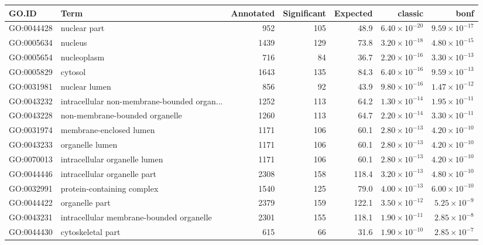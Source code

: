 \begin{table}[ht]
\centering
\begin{adjustbox}{max width=\textwidth}
\begin{tabular}{llrrrrr}
  \hline
GO.ID & Term & Annotated & Significant & Expected & classic & bonf \\ 
  \hline
GO:0044428 & nuclear part & 952 & 105 & 48.9 & $6.40 \times 10^{-20}$ & $9.59 \times 10^{-17}$ \\ 
  GO:0005634 & nucleus & 1439 & 129 & 73.8 & $3.20 \times 10^{-18}$ & $4.80 \times 10^{-15}$ \\ 
  GO:0005654 & nucleoplasm & 716 & 84 & 36.7 & $2.20 \times 10^{-16}$ & $3.30 \times 10^{-13}$ \\ 
  GO:0005829 & cytosol & 1643 & 135 & 84.3 & $6.40 \times 10^{-16}$ & $9.59 \times 10^{-13}$ \\ 
  GO:0031981 & nuclear lumen & 856 & 92 & 43.9 & $9.80 \times 10^{-16}$ & $1.47 \times 10^{-12}$ \\ 
  GO:0043232 & intracellular non-membrane-bounded organ... & 1252 & 113 & 64.2 & $1.30 \times 10^{-14}$ & $1.95 \times 10^{-11}$ \\ 
  GO:0043228 & non-membrane-bounded organelle & 1260 & 113 & 64.7 & $2.20 \times 10^{-14}$ & $3.30 \times 10^{-11}$ \\ 
  GO:0031974 & membrane-enclosed lumen & 1171 & 106 & 60.1 & $2.80 \times 10^{-13}$ & $4.20 \times 10^{-10}$ \\ 
  GO:0043233 & organelle lumen & 1171 & 106 & 60.1 & $2.80 \times 10^{-13}$ & $4.20 \times 10^{-10}$ \\ 
  GO:0070013 & intracellular organelle lumen & 1171 & 106 & 60.1 & $2.80 \times 10^{-13}$ & $4.20 \times 10^{-10}$ \\ 
  GO:0044446 & intracellular organelle part & 2308 & 158 & 118.4 & $3.20 \times 10^{-13}$ & $4.80 \times 10^{-10}$ \\ 
  GO:0032991 & protein-containing complex & 1540 & 125 & 79.0 & $4.00 \times 10^{-13}$ & $6.00 \times 10^{-10}$ \\ 
  GO:0044422 & organelle part & 2379 & 159 & 122.1 & $3.50 \times 10^{-12}$ & $5.25 \times 10^{-9}$ \\ 
  GO:0043231 & intracellular membrane-bounded organelle & 2301 & 155 & 118.1 & $1.90 \times 10^{-11}$ & $2.85 \times 10^{-8}$ \\ 
  GO:0044430 & cytoskeletal part & 615 & 66 & 31.6 & $1.90 \times 10^{-10}$ & $2.85 \times 10^{-7}$ \\ 

\end{tabular}
\end{adjustbox}
\end{table}
